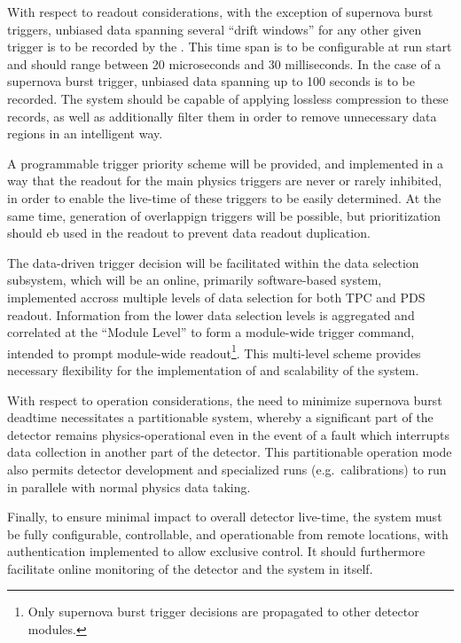 With respect to readout considerations, with the exception of
supernova burst triggers, unbiased data spanning several ``drift
windows'' for any other given trigger is
to be recorded by the . This time span is to be configurable at run start and
should range between 20 microseconds and 30 milliseconds. In the case
of a supernova burst trigger, unbiased data spanning up to 100 seconds
is to be recorded. The  system should be capable of
applying lossless compression to these records, as well as
additionally filter them in order to remove unnecessary data regions
in an intelligent way.

A programmable trigger priority scheme will be provided, and
implemented in a way that the readout for the main physics triggers
are never or rarely inhibited, in order to enable the live-time of
these triggers to be easily determined. At the same time, generation
of overlappign triggers will be possible, but prioritization should eb
used in the readout to prevent data readout duplication. 

The data-driven trigger decision will be facilitated within the data
selection subsystem, which will be an online, primarily software-based system, implemented accross multiple levels of
data selection for both TPC and PDS readout. Information from the
lower data selection levels is aggregated and correlated at the
``Module Level'' to form a module-wide trigger command, intended to
prompt module-wide readout\footnote{Only supernova burst trigger decisions are
propagated to other detector modules.}.
This multi-level scheme provides necessary flexibility for the
implementation of and scalability of the  system. 
 
With respect to operation considerations, the need to minimize
supernova burst deadtime necessitates a partitionable  system,
whereby a significant part of the detector remains physics-operational
even in the event of a fault which interrupts data collection in
another part of the detector. This partitionable operation mode also
permits detector development and specialized runs (e.g.~calibrations)
to run in parallele with normal physics data taking.

Finally, to ensure minimal impact to overall detector live-time, the  system must be fully configurable,
controllable, and operationable from remote locations, with
authentication implemented to allow exclusive control. It should
furthermore facilitate online monitoring of the detector and the 
system in itself.

